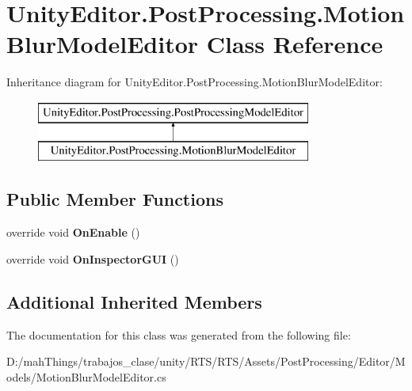 \hypertarget{class_unity_editor_1_1_post_processing_1_1_motion_blur_model_editor}{}\section{Unity\+Editor.\+Post\+Processing.\+Motion\+Blur\+Model\+Editor Class Reference}
\label{class_unity_editor_1_1_post_processing_1_1_motion_blur_model_editor}
Inheritance diagram for Unity\+Editor.\+Post\+Processing.\+Motion\+Blur\+Model\+Editor\+:\begin{figure}[H]
\begin{center}
\leavevmode
\includegraphics[height=2.000000cm]{class_unity_editor_1_1_post_processing_1_1_motion_blur_model_editor}
\end{center}
\end{figure}
\subsection*{Public Member Functions}
\begin{DoxyCompactItemize}
\item 
\mbox{\label{class_unity_editor_1_1_post_processing_1_1_motion_blur_model_editor_a3cc4895e7a3e5aa942b94c6f4ff1126a}} 
override void {\bfseries On\+Enable} ()
\item 
\mbox{\label{class_unity_editor_1_1_post_processing_1_1_motion_blur_model_editor_ab747616bf4f9492da7e18ea96f9f0360}} 
override void {\bfseries On\+Inspector\+G\+UI} ()
\end{DoxyCompactItemize}
\subsection*{Additional Inherited Members}


The documentation for this class was generated from the following file\+:\begin{DoxyCompactItemize}
\item 
D\+:/mah\+Things/trabajos\+\_\+clase/unity/\+R\+T\+S/\+R\+T\+S/\+Assets/\+Post\+Processing/\+Editor/\+Models/Motion\+Blur\+Model\+Editor.\+cs\end{DoxyCompactItemize}
